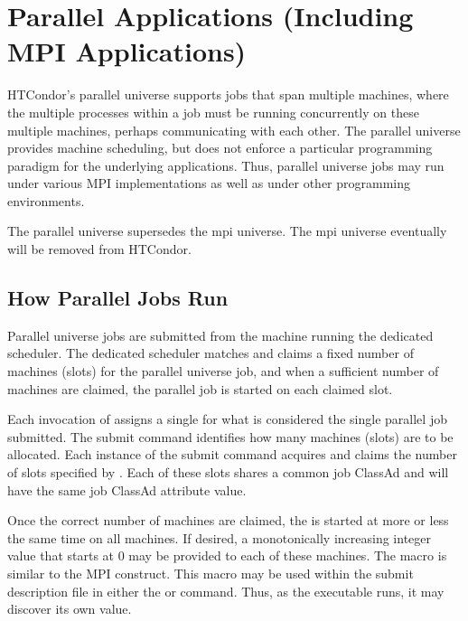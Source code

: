\section{\label{sec:Parallel}Parallel Applications (Including MPI Applications)}

HTCondor's parallel universe supports jobs that span multiple machines,
where the multiple processes within a job must be running concurrently
on these multiple machines, perhaps communicating with each other.
The parallel universe provides machine scheduling,
but does not enforce a particular programming paradigm for the
underlying applications.
Thus, parallel universe jobs may run under various MPI implementations
as well as under other programming environments. 

The parallel universe supersedes the mpi universe.
The mpi universe eventually will be removed from HTCondor.

\subsection{\label{sec:parallel-model}How Parallel Jobs Run}

Parallel universe jobs are submitted from the machine running 
the dedicated scheduler.
The dedicated scheduler matches and claims a fixed number of machines (slots)
for the parallel universe job,
and when a sufficient number of machines are claimed,
the parallel job is started on each claimed slot.

Each invocation of  assigns a single 
for what is considered the single parallel job submitted.
The  submit command identifies how 
many machines (slots) are to be allocated.
Each instance of the  submit command acquires
and claims the number of slots specified by .
Each of these slots shares a common job ClassAd and
will have the same  job ClassAd attribute value.

Once the correct number of machines are claimed, 
the  is started at more or less the same
time on all machines.
If desired, a monotonically increasing integer value that starts
at 0 may be provided to each of these machines.
The macro  is similar to the MPI 
construct. This macro may be used within the submit description
file in either the  or 
command.
Thus, as the executable runs, it may discover its own 
value.

